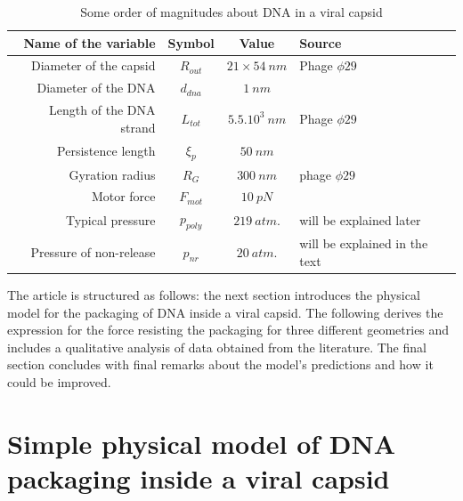 \documentclass{article}
\begin{document}

\begin{table}[h]
    \centering
    \begin{tabular}{|| r | c | c | l ||}
        \hline \hline
        \textbf{Name of the variable} & \textbf{Symbol} & \textbf{Value} & \textbf{Source} \\
        \hline \hline
        Diameter of the capsid  & $R_{out}$   & $21\times 54~nm$ & Phage $\phi29$ \cite{tao1998}  \\
        Diameter of the DNA    & $ d_{dna}$  & $1~nm$           & \cite{phillips2005} \\
        Length of the DNA strand & $ L_{tot}$  & $5.5.10^{3}~nm$  & Phage $\phi29$ \cite{tao1998} \\
        Persistence length       & $ \xi_p $   & $50~nm$           & \cite{smith2001} \\
        Gyration radius          & $ R_{G} $     & $300~nm$         & phage $\phi29$ \cite{phillips2005} \\
        Motor force              & $ F_{mot}$  & $10~pN$          & \cite{phillips2005} \\
        Typical pressure         & $ p_{poly}$ & $219~atm.$       & will be explained later \\
        Pressure of non-release  & $ p_{nr} $  & $20~atm.$        & will be explained in the text \\
        \hline \hline
    \end{tabular}
    \caption{Some order of magnitudes about DNA in a viral capsid}
    \label{tab:figures}
\end{table}
The article is structured as follows: the next section introduces the physical model for the packaging of DNA inside a viral capsid. The following derives the expression for the force resisting the packaging for three different geometries and includes a qualitative analysis of data obtained from the literature. The final section concludes with final remarks about the model's predictions and how it could be improved.

\section{Simple physical model of DNA packaging inside a viral capsid}
\end{document}
